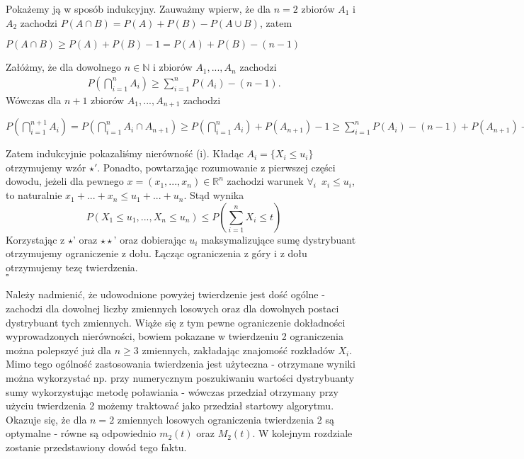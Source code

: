 \documentclass[12pt,a4paper,openany]{book}
\newcommand*{\QEDB}{\hfill\ensuremath{\square}}
\begin{document}
\noindent Pokażemy ją w sposób indukcyjny. Zauważmy wpierw, że dla $n= 2$ zbiorów $A_{1}$ i $A_{2}$ zachodzi
$P(A \cap B) = P(A) + P(B) - P(A \cup B)$, zatem
\begin{center}
$P(A \cap B) \geqslant P(A) + P(B) - 1 = P(A) + P(B) - (n-1) $
\end{center}
\noindent Załóżmy, że dla dowolnego $n \in \mathbb{N}$ i zbiorów $A_{1},...,A_{n}$ zachodzi
\begin{gather}
P\left( \bigcap\limits_{i=1}^{n} A_{i}\right) \geqslant \sum\limits_{i=1}^{n} P(A_{i})  - (n-1). \tag{i}
\end{gather}
\noindent Wówczas dla $n+1$ zbiorów $A_{1},...,A_{n+1}$ zachodzi
\begin{center}
$P\left( \bigcap\limits_{i=1}^{n+1} A_{i}\right) = P\left( \bigcap\limits_{i=1}^{n} A_{i} \cap A_{n+1} \right) \geqslant P\left( \bigcap\limits_{i=1}^{n} A_{i} \right) + P\left( A_{n+1} \right) -1 \geqslant 
\sum\limits_{i=1}^{n} P(A_{i})  - (n-1) + P\left( A_{n+1} \right) -1 =  \sum\limits_{i=1}^{n+1} P(A_{i})  - ((n+1)-1) .$
\end{center}
\noindent Zatem indukcyjnie pokazaliśmy nierówność (i). Kładąc $A_{i} = \lbrace X_{i} \leqslant u_{i} \rbrace$ otrzymujemy wzór $\star '$. Ponadto, powtarzając rozumowanie z pierwszej części dowodu, jeżeli dla pewnego $x = (x_{1},...,x_{n}) \in \mathbb{R}^n$ zachodzi warunek $\forall_{i} \phantom{1} x_{i} \leqslant u_{i}$, to naturalnie $x_{1} + ... + x_{n} \leqslant u_{1} + ... + u_{n}$. Stąd wynika
\begin{equation}
P\left( X_{1} \leqslant u_{1},..., X_{n}  \leqslant u_{n} \right) \leqslant P\left(\sum\limits_{i=1}^{n} X_{i} \leqslant t\right) \tag{$\star\star$'}
\end{equation}
Korzystając z $\star$' oraz $\star\star$' oraz dobierając ${u_{i}}$ maksymalizujące sumę dystrybuant otrzymujemy ograniczenie z dołu.
Łącząc ograniczenia z góry i z dołu otrzymujemy tezę twierdzenia.\\
 \phantom{1} \hfill \QEDB
 
Należy nadmienić, że udowodnione powyżej twierdzenie jest dość ogólne - zachodzi dla dowolnej liczby zmiennych losowych oraz dla dowolnych postaci dystrybuant tych zmiennych. Wiąże się z tym pewne ograniczenie dokładności wyprowadzonych nierówności, bowiem pokazane w twierdzeniu 2 ograniczenia można polepszyć już dla $n \geqslant 3$ zmiennych, zakładając znajomość rozkładów $X_{i}$. Mimo tego ogólność zastosowania twierdzenia jest użyteczna - otrzymane wyniki można wykorzystać np. przy numerycznym poszukiwaniu wartości dystrybuanty sumy wykorzystując metodę poławiania - wówczas przedział otrzymany przy użyciu twierdzenia 2 możemy traktować jako przedział startowy algorytmu.\\
Okazuje się, że dla $n = 2$ zmiennych losowych ograniczenia twierdzenia 2 są optymalne - równe są odpowiednio $m_{2}(t)$ oraz $M_{2}(t)$. W kolejnym rozdziale zostanie przedstawiony dowód tego faktu.
\end{document}
